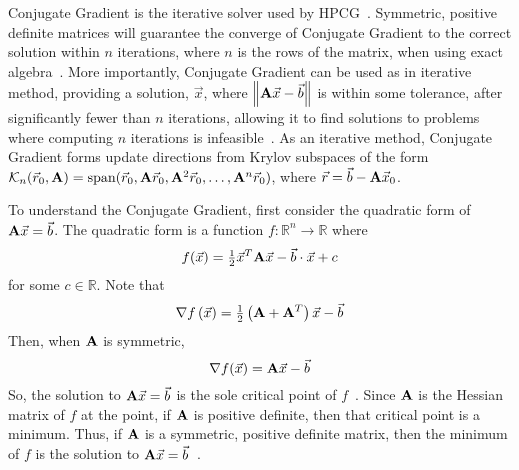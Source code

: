Conjugate Gradient is the iterative solver used by HPCG~\cite{Dongarra:2015:HPCG}.
Symmetric, positive definite matrices will guarantee the converge of Conjugate Gradient to the correct solution within \(n\) iterations, where \(n\) is the rows of the matrix, when using exact algebra~\cite{Saad:2003:IterativeMethods}.
More importantly, Conjugate Gradient can be used as in iterative method, providing a solution, \(\vec{x}\), where \(\left\|\mathbf{A}\vec{x}-\vec{b}\right\|\) is within some tolerance, after significantly fewer than \(n\) iterations, allowing it to find solutions to problems where computing \(n\) iterations is infeasible~\cite{Shewchuk:1994:IntroToCG}.
As an iterative method, Conjugate Gradient forms update directions from Krylov subspaces of the form \(\mathcal{K}_n(\vec{r}_0, \mathbf{A})=\text{span}(\vec{r}_0, \mathbf{A}\vec{r}_0, \mathbf{A}^2\vec{r}_0, \dots, \mathbf{A}^n\vec{r}_0)\), where \(\vec{r}=\vec{b}-\mathbf{A}\vec{x}_0\).

To understand the Conjugate Gradient, first consider the quadratic form of \(\mathbf{A}\vec{x} = \vec{b}\).
The quadratic form is a function \(f:\mathbb{R}^n\to\mathbb{R}\) where
\begin{equation}
\label{eq:cg-quad-form}
	f(\vec{x}) = \tfrac{1}{2}\vec{x}^T\mathbf{A}\vec{x} - \vec{b}\cdot\vec{x} + c
\end{equation}
for some \(c\in\mathbb{R}\).
Note that
\[
	\nabla f\left(\vec{x}\right) = \tfrac{1}{2}\left(\mathbf{A}+\mathbf{A}^T\right)\vec{x}-\vec{b}
\]
Then, when \(\mathbf{A}\) is symmetric,
\begin{equation*}
	\nabla f(\vec{x}) = \mathbf{A}\vec{x} - \vec{b}
\end{equation*}
So, the solution to \(\mathbf{A}\vec{x} = \vec{b}\) is the sole critical point of \(f\)~\cite{Nearing:2010:toolsForPhysics}.
Since \(\mathbf{A}\) is the Hessian matrix of \(f\) at the point, if \(\mathbf{A}\) is positive definite, then that critical point is a minimum.
Thus, if \(\mathbf{A}\) is a symmetric, positive definite matrix, then the minimum of \(f\) is the solution to \(\mathbf{A}\vec{x} = \vec{b}\)~\cite{Shewchuk:1994:IntroToCG}.

